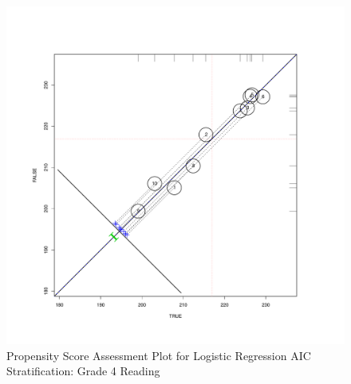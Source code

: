 \documentclass[letterpaper,12p,twoside]{article} %
\begin{document}
\clearpage
\begin{figure}
\begin{center}
\includegraphics[height=.4\textheight,width=.4\textheight]{../Figures2009/g4read-circpsa10-AIC.pdf}
\caption{Propensity Score Assessment Plot for Logistic Regression AIC Stratification: Grade 4 Reading}
\end{center}
\end{figure}


\end{document}
